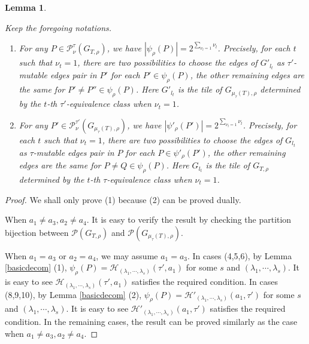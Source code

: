 \documentclass[10pt]{amsart}
\theoremstyle{theorems}
\newtheorem{Lemma}[Theorem]{Lemma}
\begin{document}
\medskip

\begin{Lemma}\label{2^m}

Keep the foregoing notations.

\begin{enumerate}[$(1)$]

  \item For any $P\in \mathcal P^{\tau}_{\nu}(G_{T,\rho})$, we have $|\psi_{\rho}(P)|=2^{\sum_{\nu_l=1}\nu_l}$. Precisely, for each $t$ such that $\nu_t=1$, there are two possibilities to choose the edges of $G'_{l_t}$ as $\tau'$-mutable edges pair in $P'$ for each $P'\in \psi_{\rho}(P)$, the other remaining edges are the same for $P'\neq P''\in \psi_{\rho}(P)$. Here $G'_{l_t}$ is the tile of $G_{\mu_{\tau}(T),\rho}$ determined by the $t$-th $\tau'$-equivalence class when $\nu_t=1$.

  \item For any $P'\in \mathcal P^{\tau'}_{\nu}(G_{\mu_{\tau}(T),\rho})$, we have $|\psi'_{\rho}(P')|=2^{\sum_{\nu_l=1}\nu_l}$. Precisely, for each $t$ such that $\nu_t=1$, there are two possibilities to choose the edges of $G_{l_t}$ as $\tau$-mutable edges pair in $P$ for each $P\in \psi'_{\rho}(P')$, the other remaining edges are the same for $P\neq Q\in \psi_{\rho}(P)$. Here $G_{l_t}$ is the tile of $G_{T,\rho}$ determined by the $t$-th $\tau$-equivalence class when $\nu_t=1$.

\end{enumerate}

\end{Lemma}

\begin{proof}

We shall only prove (1) because (2) can be proved dually.

When $a_1\neq a_3, a_2\neq a_4$. It is easy to verify the result by checking the partition bijection between $\mathcal P(G_{T,\rho})$ and $\mathcal P(G_{\mu_{\tau}(T),\rho})$.

When $a_1=a_3$ or $a_2=a_4$, we may assume $a_1=a_3$. In cases (4,5,6), by Lemma \ref{basicdecom} (1), $\psi_{\rho}(P)=\mathcal H_{(\lambda_1,\cdots,\lambda_s)}(\tau',a_1)$ for some $s$ and $(\lambda_1,\cdots,\lambda_s)$. It is easy to see $\mathcal H_{(\lambda_1,\cdots,\lambda_s)}(\tau',a_1)$ satisfies the required condition. In cases (8,9,10), by Lemma \ref{basicdecom} (2), $\psi_{\rho}(P)=\mathcal H'_{(\lambda_1,\cdots,\lambda_s)}(a_1,\tau')$ for some $s$ and $(\lambda_1,\cdots,\lambda_s)$. It is easy to see $\mathcal H'_{(\lambda_1,\cdots,\lambda_s)}(a_1,\tau')$ satisfies the required condition. In the remaining cases, the result can be proved similarly as the case when $a_1\neq a_3, a_2\neq a_4$.
\end{proof}
\end{document}
